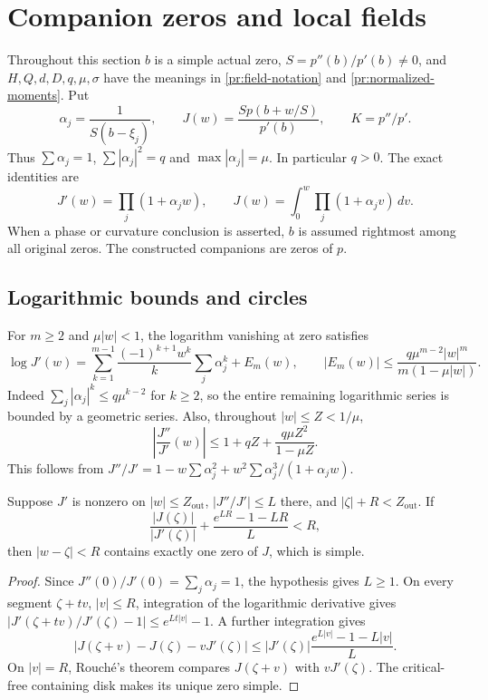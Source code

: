 \section{Companion zeros and local fields}\label{sec:local-tools}

Throughout this section $b$ is a simple actual zero, $S=p''(b)/p'(b)\ne0$,
and $H,Q,d,D,q,\mu,\sigma$ have the meanings in
\eqref{pr:field-notation} and \eqref{pr:normalized-moments}. Put
\[
 \alpha_j=\frac1{S(b-\xi_j)},\qquad
 J(w)=\frac{S p(b+w/S)}{p'(b)},\qquad K=p''/p'.
\]
Thus $\sum\alpha_j=1$, $\sum|\alpha_j|^2=q$ and
$\max|\alpha_j|=\mu$. In particular $q>0$. The exact identities are
\begin{equation}\label{lt:finite-product}
 J'(w)=\prod_j(1+\alpha_jw),\qquad
 J(w)=\int_0^w\prod_j(1+\alpha_jv)\,dv.
\end{equation}
When a phase or curvature conclusion is asserted, $b$ is assumed
rightmost among all original zeros. The constructed companions are
zeros of $p$.

\subsection{Logarithmic bounds and circles}

For $m\ge2$ and $\mu|w|<1$, the logarithm vanishing at zero satisfies
\begin{equation}\label{lt:log-tail}
 \log J'(w)=\sum_{k=1}^{m-1}\frac{(-1)^{k+1}w^k}{k}
                    \sum_j\alpha_j^k+E_m(w),\qquad
 |E_m(w)|\le\frac{q\mu^{m-2}|w|^m}{m(1-\mu|w|)}.
\end{equation}
Indeed $\sum_j|\alpha_j|^k\le q\mu^{k-2}$ for $k\ge2$, so the
entire remaining logarithmic series is bounded by a geometric series.
Also, throughout $|w|\le Z<1/\mu$,
\begin{equation}\label{lt:log-derivative}
 \left|\frac{J''}{J'}(w)\right|
 \le1+qZ+\frac{q\mu Z^2}{1-\mu Z}.
\end{equation}
This follows from
$J''/J'=1-w\sum\alpha_j^2+w^2\sum\alpha_j^3/(1+\alpha_jw)$.

\begin{lemma}\label{lt:circle}
Suppose $J'$ is nonzero on $|w|\le Z_{\mathrm{out}}$,
$|J''/J'|\le L$ there, and $|\zeta|+R<Z_{\mathrm{out}}$. If
\[
 \frac{|J(\zeta)|}{|J'(\zeta)|}
       +\frac{e^{LR}-1-LR}{L}<R,
\]
then $|w-\zeta|<R$ contains exactly one zero of $J$, which is simple.
\end{lemma}
\begin{proof}
Since $J''(0)/J'(0)=\sum_j\alpha_j=1$, the hypothesis gives $L\ge1$.
On every segment $\zeta+tv$, $|v|\le R$, integration of the
logarithmic derivative gives
$|J'(\zeta+tv)/J'(\zeta)-1|\le e^{Lt|v|}-1$.
A further integration gives
\[
 |J(\zeta+v)-J(\zeta)-vJ'(\zeta)|
 \le |J'(\zeta)|\frac{e^{L|v|}-1-L|v|}{L}.
\]
On $|v|=R$, Rouch\'e's theorem compares
$J(\zeta+v)$ with $vJ'(\zeta)$. The critical-free containing disk
makes its unique zero simple.
\end{proof}

